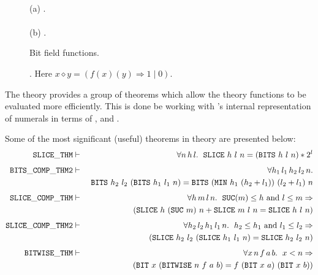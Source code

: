 \begin{figure}
\begin{center}
 \\[3mm]
(a) . \\[6mm]
 \\[3mm]
(b) .
\end{center}
\caption{Bit field functions.\label{bits-slice}}
\end{figure}

\begin{figure}
\begin{center}

\end{center}
\caption{. Here $x\diamond y = (f(x)(y) \Rightarrow 1 \mid 0)$.\label{bitwise}}
\end{figure}

The  theory provides a group of theorems which allow the  theory functions to be evaluated more efficiently.
This is done be working with \HOL's internal representation of numerals \ie{} in terms of ,  and .

Some of the most significant (useful) theorems in  theory are presented below:
\begin{eqnarray*}
\mathtt{SLICE\_THM} & \vdash & \forall n\,h\,l.\ \;\slice\ h\ l\ n = (\bits\ h\ l\ n) * 2^l \\[4pt]
\mathtt{BITS\_COMP\_THM2} & \vdash & \forall h_1\,l_1\,h_2\,l_2\,n.\\*
&& \ \bits\ h_2\ l_2\ (\bits\ h_1\ l_1\ n) = \bits\ (\minn\ h_1\ (h_2 + l_1))\ (l_2 + l_1)\ n \\[4pt]
\mathtt{SLICE\_COMP\_THM} & \vdash &
   \forall h\,m\,l\,n.\ \;\suc(m) \leq h \mbox{ and } l \leq m \Rightarrow \\*
&& \quad (\slice\ h\ (\suc\ m)\ n + \slice\ m\ l\ n = \slice\ h\ l\ n) \\[4pt]
\mathtt{SLICE\_COMP\_THM2} & \vdash &
   \forall h_2\,l_2\,h_1\,l_1\,n.\ \; h_2 \leq h_1 \mbox{ and } l_1 \leq l_2 \Rightarrow \\*
&& \quad (\slice\ h_2\ l_2\ (\slice\ h_1\ l_1\ n) = \slice\ h_2\ l_2\ n) \\[4pt]
\mathtt{BITWISE\_THM} & \vdash &
   \forall x\,n\,f\,a\,b.\ \;
        x < n \Rightarrow \\*
&& \quad (\bit\ x\ (\bitwise\ n\ f\ a\ b) = f\ (\bit\ x\ a)\ (\bit\ x\ b))
\end{eqnarray*}


